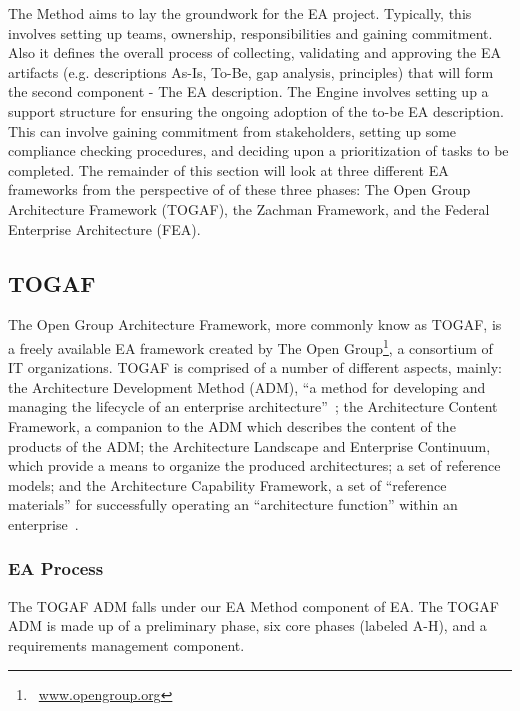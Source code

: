 The Method aims to lay the groundwork for the EA project. Typically, this involves setting up teams, ownership, responsibilities and gaining commitment. Also it defines the overall process of collecting, validating and approving the EA artifacts  (e.g. descriptions As-Is, To-Be, gap analysis,  principles) that will form the second component - The EA description.  The Engine involves setting up a support structure for ensuring the ongoing adoption of the to-be EA description. This can involve gaining commitment from stakeholders, setting up some compliance checking procedures, and deciding upon a prioritization of tasks to be completed. The remainder of this section will look at three different EA frameworks from the perspective of of these three phases: The Open Group Architecture Framework (TOGAF), the Zachman Framework, and the Federal Enterprise Architecture (FEA).


\subsection{TOGAF}
The Open Group Architecture Framework, more commonly know as TOGAF, is a freely available EA framework created by The Open Group\footnote{~\url{www.opengroup.org}}, a consortium of IT organizations. TOGAF is comprised of a number of different aspects, mainly: the Architecture Development Method (ADM), ``a method for developing and managing the lifecycle of an enterprise architecture''~\cite[Ch. 5.1]{togaf9.1}; the Architecture Content Framework, a companion to the ADM which describes the content of the products of the ADM; the Architecture Landscape and Enterprise Continuum, which provide a means to organize the produced architectures; a set of reference models; and the Architecture Capability Framework, a set of ``reference materials'' for successfully operating an ``architecture function'' within an enterprise~\cite[Ch. 45]{togaf9.1}. 

%
%


\subsubsection{EA Process}
The TOGAF ADM falls under our EA Method component of EA. The TOGAF ADM is made up of a preliminary phase, six core phases (labeled A-H), and a requirements management component. 

